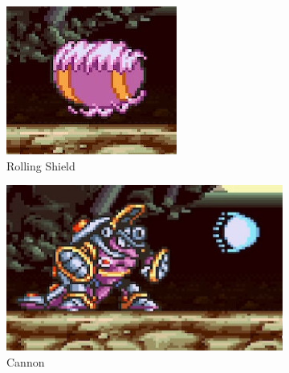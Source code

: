 \begin{figure}[htp]
	\centering
	\begin{subfigure}[t]{0.3\textwidth}
		\centering
		\includegraphics[width=\linewidth]{figures/X1/Armored_armadillo/Armadillo_rolling.jpg}
		\caption{Rolling Shield}
	\end{subfigure}
	\begin{subfigure}[t]{0.4\textwidth}
		\centering
		\includegraphics[width=\linewidth]{figures/X1/Armored_armadillo/Armadillo_cannon.jpg}
		\caption{Cannon}
	\end{subfigure}	
	\begin{subfigure}{0.35\textwidth}
		\centering

\end{subfigure}
\end{figure}

